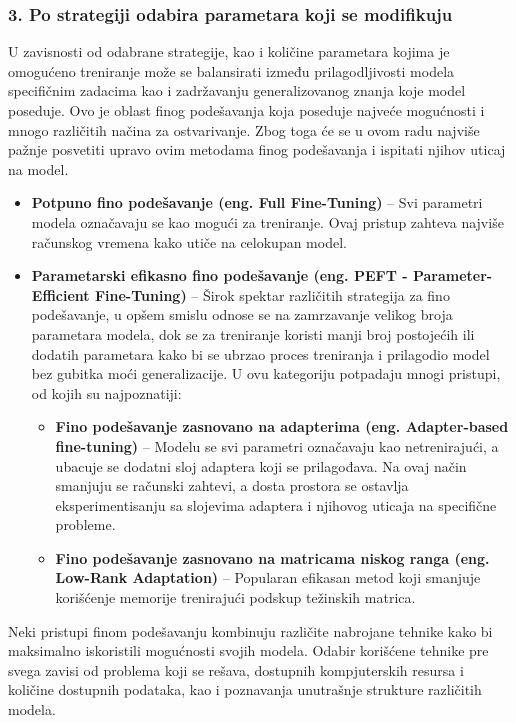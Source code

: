 \documentclass[12pt,oneside]{memoir}
\begin{document}
\subsubsection{3. Po strategiji odabira parametara koji se modifikuju}
U zavisnosti od odabrane strategije, kao i količine parametara kojima je omogućeno treniranje može se balansirati između prilagodljivosti modela specifičnim zadacima kao i zadržavanju generalizovanog znanja koje model poseduje. Ovo je oblast finog podešavanja koja poseduje najveće mogućnosti i mnogo različitih načina za ostvarivanje. Zbog toga će se u ovom radu najviše pažnje posvetiti upravo ovim metodama finog podešavanja i ispitati njihov uticaj na model.
\begin{itemize}
	\item \textbf{Potpuno fino podešavanje (eng. Full Fine-Tuning)} – Svi parametri modela označavaju se kao mogući za treniranje. Ovaj pristup zahteva najviše računskog vremena kako utiče na celokupan model.
	\item \textbf{Parametarski efikasno fino podešavanje (eng. PEFT - Parameter-Efficient Fine-Tuning)} – 
	Širok spektar različitih strategija za fino podešavanje, u opšem smislu odnose se na zamrzavanje velikog broja parametara modela, dok se za treniranje koristi manji broj postojećih ili dodatih parametara kako bi se ubrzao proces treniranja i prilagodio model bez gubitka moći generalizacije. U ovu kategoriju potpadaju mnogi pristupi, od kojih su najpoznatiji:
	\begin{itemize}
			\item \textbf{Fino podešavanje zasnovano na adapterima (eng. Adapter-based fine-tuning)} – Modelu se svi parametri označavaju kao netrenirajući, a ubacuje se dodatni sloj adaptera koji se prilagođava. Na ovaj način smanjuju se računski zahtevi, a dosta prostora se ostavlja eksperimentisanju sa slojevima adaptera i njihovog uticaja na specifične probleme.
			\item \textbf{Fino podešavanje zasnovano na matricama niskog ranga (eng. Low-Rank Adaptation)} – Popularan efikasan metod koji smanjuje korišćenje memorije trenirajući podskup težinskih matrica.
	\end{itemize}	
	
\end{itemize}

Neki pristupi finom podešavanju kombinuju različite nabrojane tehnike kako bi maksimalno iskoristili mogućnosti svojih modela. Odabir korišćene tehnike pre svega zavisi od problema koji se rešava, dostupnih kompjuterskih resursa i količine dostupnih podataka, kao i poznavanja unutrašnje strukture različitih modela.
\end{document}
